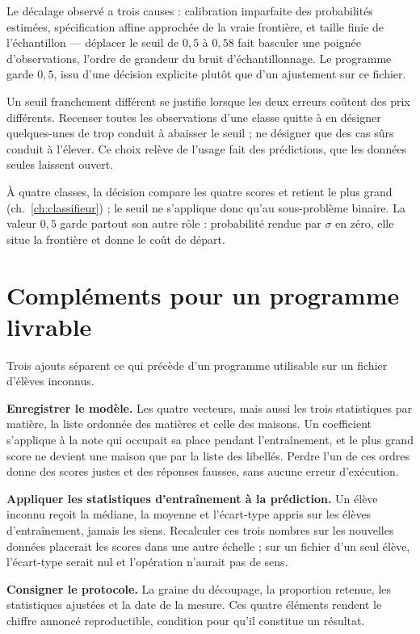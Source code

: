 Le décalage observé a trois causes : calibration imparfaite des probabilités
estimées, spécification affine approchée de la vraie frontière, et taille finie
de l'échantillon --- déplacer le seuil de $0{,}5$ à $0{,}58$ fait basculer une
poignée d'observations, l'ordre de grandeur du bruit d'échantillonnage. Le
programme garde $0{,}5$, issu d'une décision explicite plutôt que d'un ajustement
sur ce fichier.

Un seuil franchement différent se justifie lorsque les deux erreurs coûtent des
prix différents. Recenser toutes les observations d'une classe quitte à en
désigner quelques-unes de trop conduit à abaisser le seuil ; ne désigner que des
cas sûrs conduit à l'élever. Ce choix relève de l'usage fait des prédictions, que
les données seules laissent ouvert.

À quatre classes, la décision compare les quatre scores et retient le plus grand
(ch.~\ref{ch:classifieur}) ; le seuil ne s'applique donc qu'au sous-problème
binaire. La valeur $0{,}5$ garde partout son autre rôle : probabilité rendue par
$\sigma$ en zéro, elle situe la frontière et donne le coût de départ.

\section{Compléments pour un programme livrable}

Trois ajouts séparent ce qui précède d'un programme utilisable sur un fichier
d'élèves inconnus.

\textbf{Enregistrer le modèle.} Les quatre vecteurs, mais aussi les trois
statistiques par matière, la liste ordonnée des matières et celle des maisons. Un
coefficient s'applique à la note qui occupait sa place pendant l'entraînement, et
le plus grand score ne devient une maison que par la liste des libellés. Perdre
l'un de ces ordres donne des scores justes et des réponses fausses, sans aucune
erreur d'exécution.

\textbf{Appliquer les statistiques d'entraînement à la prédiction.} Un élève
inconnu reçoit la médiane, la moyenne et l'écart-type appris sur les élèves
d'entraînement, jamais les siens. Recalculer ces trois nombres sur les nouvelles
données placerait les scores dans une autre échelle ; sur un fichier d'un seul
élève, l'écart-type serait nul et l'opération n'aurait pas de sens.

\textbf{Consigner le protocole.} La graine du découpage, la proportion retenue,
les statistiques ajustées et la date de la mesure. Ces quatre éléments rendent le
chiffre annoncé reproductible, condition pour qu'il constitue un résultat.

